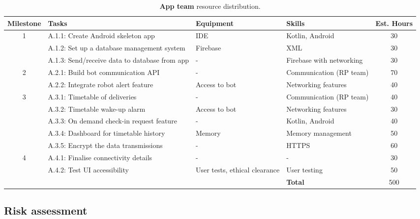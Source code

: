 \documentclass{article}
\begin{document}
\begin{table*}[]
  \begin{center}
  \begin{small}
  \begin{tabular}{|c|l|l|l|c|}
    \hline
    {\bf Milestone} & {\bf Tasks} & {\bf Equipment} & {\bf Skills} & {\bf Est. Hours} \\ \hline
    1               & A.1.1: Create Android skeleton app & IDE & Kotlin, Android & 30\\ \cline{2-5}
                    & A.1.2: Set up a database management system & Firebase & XML & 30\\ \cline{2-5}
                    & A.1.3: Send/receive data to database from app & - & Firebase with networking & 30\\ \hline
    2               & A.2.1: Build bot communication API & - & Communication (RP team) & 70\\ \cline{2-5}
                    & A.2.2: Integrate robot alert feature & Access to bot & Networking features & 40\\ \hline
    3               & A.3.1: Timetable of deliveries & - & Communication (RP team) & 40\\ \cline{2-5}
                    & A.3.2: Timetable wake-up alarm & Access to bot & Networking features & 30\\ \cline{2-5}
                    & A.3.3: On demand check-in request feature & - & Kotlin, Android & 40\\ \cline{2-5}
                    & A.3.4: Dashboard for timetable history & Memory & Memory management & 50\\ \cline{2-5}
                    & A.3.5: Encrypt the data transmissions & - & HTTPS & 60\\ \hline
    4               & A.4.1: Finalise connectivity details & - & - & 30\\ \cline{2-5}
                    & A.4.2: Test UI accessibility & User tests, ethical clearance & User testing & 50\\ \hline
                    &                           &  & {\bf Total} & 500 \\ \hline
  \end{tabular}
  \end{small}
  \caption{{\bf App team} resource distribution.}
  \label{tab:app-rd}
  \end{center}
\end{table*}


\subsection{Risk assessment} 
\end{document}
